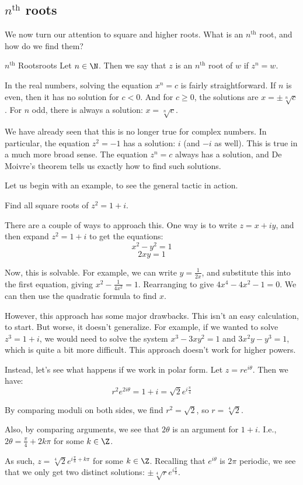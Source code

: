 \subsection{$n^{\text{th}}$ roots}

We now turn our attention to square and higher roots. What is an $n^{\text{th}}$ root, and how do we find them?

\begin{defbo}{$n^{\text{th}}$ Roots}{roots}
Let $n\in\N$. Then we say that $z$ is an $n^{\text{th}}$ root of $w$ if $z^n = w$.
\end{defbo}

In the real numbers, solving the equation $x^n = c$ is fairly straightforward. If $n$ is even, then it has no solution for $c < 0$. And for $c \ge 0$, the solutions are $x = \pm\sqrt[n]{c}$. For $n$ odd, there is always a solution: $x = \sqrt[n]{c}$.

We have already seen that this is no longer true for complex numbers. In particular, the equation $z^2 = -1$ has a solution: $i$ (and $-i$ as well). This is true in a much more broad sense. The equation $z^n = c$ always has a solution, and De Moivre's theorem tells us exactly how to find such solutions.

Let us begin with an example, to see the general tactic in action.

\begin{ex}{}{} Find all square roots of $z^2 = 1 + i$.

There are a couple of ways to approach this. One way is to write $z = x + iy$, and then expand $z^2 = 1+i$ to get the equations:
$$x^2 - y^2 = 1$$
$$2xy = 1$$

Now, this is solvable. For example, we can write $y = \frac{1}{2x}$, and substitute this into the first equation, giving $x^2 - \frac{1}{4x^2} = 1$. Rearranging to give $4x^4 - 4x^2 - 1 = 0$. We can then use the quadratic formula to find $x$.

However, this approach has some major drawbacks. This isn't an easy calculation, to start. But worse, it doesn't generalize. For example, if we wanted to solve $z^3 = 1+i$, we would need to solve the system $x^3 - 3xy^2 = 1$ and $3x^2y - y^3 = 1$, which is quite a bit more difficult. This approach doesn't work for higher powers.

Instead, let's see what happens if we work in polar form. Let $z = re^{i\theta}$. Then we have:
$$r^2e^{2i\theta} = 1 + i = \sqrt{2}e^{i\frac{\pi}{4}}$$

By comparing moduli on both sides, we find $r^2 = \sqrt{2}$, so $r = \sqrt[4]{2}$.

Also, by comparing arguments, we see that $2\theta$ is an argument for $1 + i$. I.e., $2\theta = \frac{\pi}{4} + 2k\pi$ for some $k\in \Z$.

As such, $z = \sqrt[4]{2}e^{i\frac{\pi}{8} + k\pi}$ for some $k\in \Z$. Recalling that $e^{i\theta}$ is $2\pi$ periodic, we see that we only get two distinct solutions: $\pm\sqrt[4]{r}e^{i\frac{\pi}{8}}$. 
\end{ex}